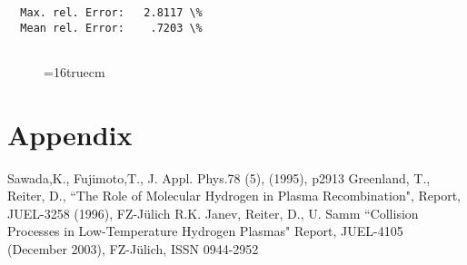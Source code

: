 \documentclass[12pt,dvipdfmx]{article}
\begin{document}
\begin{small}
\begin{verbatim}
  Max. rel. Error:   2.8117 \%
  Mean rel. Error:    .7203 \%


\end{verbatim}\end{small}
\begin{figure} \label{2.1.8c}
\epsfxsize=16truecm
\end{figure}
\newpage


\section{Appendix}
\newpage
\begin{thebibliography}{99}
 Sawada,K.,  Fujimoto,T., J. Appl. Phys.78 (5), (1995), p2913
 Greenland, T., Reiter, D.,
                   ``The Role of Molecular Hydrogen in Plasma
                    Recombination", Report, JUEL-3258 (1996), FZ-J\"ulich
 R.K. Janev, Reiter, D., U. Samm
                   ``Collision Processes in Low-Temperature Hydrogen Plasmas"
Report, JUEL-4105 (December 2003), FZ-J\"ulich, ISSN 0944-2952
 \end{thebibliography}
\end{document}
